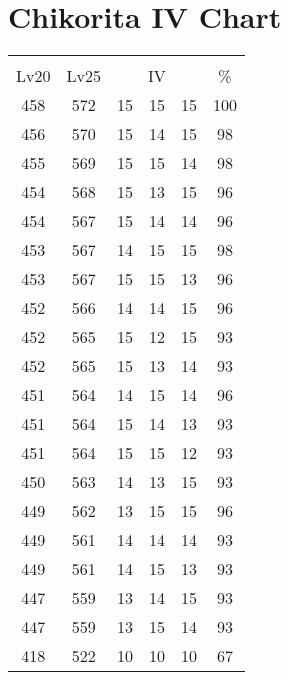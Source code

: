 \documentclass{article}%
\begin{document}
%
\normalsize%
\section{Chikorita IV Chart}%
\label{sec:Chikorita IV Chart}%
\renewcommand{\arraystretch}{1.5}%
\begin{tabular}{|c|c|c|c|c|c|}%
\hline%
\multicolumn{6}{|c|}{\textcolor{white}{ 
\linebreak{Chikorita}
}%
\cellcolor{black}}\\%
\multicolumn{1}{|c}{Lv20}&\multicolumn{1}{c|}{Lv25}&\multicolumn{3}{c|}{IV}&\multicolumn{1}{|c|}{\%}\\%
\hline%
\rowcolor{color100}%
458&572&15&15&15&100\\%
\hline%
\rowcolor{color98}%
456&570&15&14&15&98\\%
\hline%
\rowcolor{color98}%
455&569&15&15&14&98\\%
\hline%
\rowcolor{color96}%
454&568&15&13&15&96\\%
\hline%
\rowcolor{color96}%
454&567&15&14&14&96\\%
\hline%
\rowcolor{color98}%
453&567&14&15&15&98\\%
\hline%
\rowcolor{color96}%
453&567&15&15&13&96\\%
\hline%
\rowcolor{color96}%
452&566&14&14&15&96\\%
\hline%
\rowcolor{color93}%
452&565&15&12&15&93\\%
\hline%
\rowcolor{color93}%
452&565&15&13&14&93\\%
\hline%
\rowcolor{color96}%
451&564&14&15&14&96\\%
\hline%
\rowcolor{color93}%
451&564&15&14&13&93\\%
\hline%
\rowcolor{color93}%
451&564&15&15&12&93\\%
\hline%
\rowcolor{color93}%
450&563&14&13&15&93\\%
\hline%
\rowcolor{color96}%
449&562&13&15&15&96\\%
\hline%
\rowcolor{color93}%
449&561&14&14&14&93\\%
\hline%
\rowcolor{color93}%
449&561&14&15&13&93\\%
\hline%
\rowcolor{color93}%
447&559&13&14&15&93\\%
\hline%
\rowcolor{color93}%
447&559&13&15&14&93\\%
\hline%
\rowcolor{color91}%
418&522&10&10&10&67\\%
\end{tabular}

%
\end{document}
